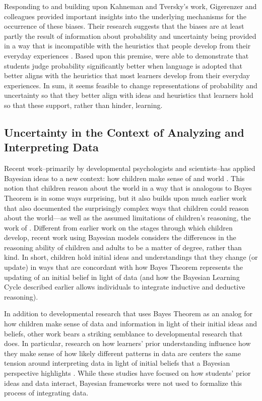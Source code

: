 \documentclass[man]{apa7}
\begin{document}
Responding to and building upon Kahneman and Tversky's work, Gigerenzer and colleagues provided important insights into the underlying mechanisms for the occurrence of these biases. Their research suggests that the biases are at least partly the result of information about probability and uncertainty being provided in a way that is incompatible with the heuristics that people develop from their everyday experiences \parencite{gh95, jkg18}. Based upon this premise, \textcite{jkg18} were able to demonstrate that students judge probability significantly better when language is adopted that better aligns with the heuristics that most learners develop from their everyday experiences. In sum, it seems feasible to change representations of probability and uncertainty so that they better align with ideas and heuristics that learners hold so that these support, rather than hinder, learning.

\subsection{Uncertainty in the Context of Analyzing and Interpreting Data}

Recent work--primarily by developmental psychologists and scientists--has applied Bayesian ideas to a new context: how children make sense of and world \parencite{g12, tgk06, tgk06}. This notion that children reason about the world in a way that is analogous to Bayes Theorem is in some ways surprising, but it also builds upon much earlier work that also documented the surprisingly complex ways that children could reason about the world---as well as the assumed limitations of children's reasoning, the work of \textcite{pi69}. Different from earlier work on the stages through which children develop, recent work using Bayesian models considers the differences in the reasoning ability of children and adults to be a matter of degree, rather than kind. In short, children hold initial ideas and understandings that they change (or update) in ways that are concordant with how Bayes Theorem represents the updating of an initial belief in light of data (and how the Bayesian Learning Cycle described earlier allows individuals to integrate inductive and deductive reasoning).

In addition to developmental research that uses Bayes Theorem as an analog for how children make sense of data and information in light of their initial ideas and beliefs, other work bears a striking semblance to developmental research that does. In particular, research on how learners’ prior understanding influence how they make sense of how likely different patterns in data are centers the same tension around interpreting data in light of initial beliefs that a Bayesian perspective highlights \parencite[e.g., ][]{kd88, mkm07, ssc07}. While these studies have focused on how students’ prior ideas and data interact, Bayesian frameworks were not used to formalize this process of integrating data.
\end{document}
